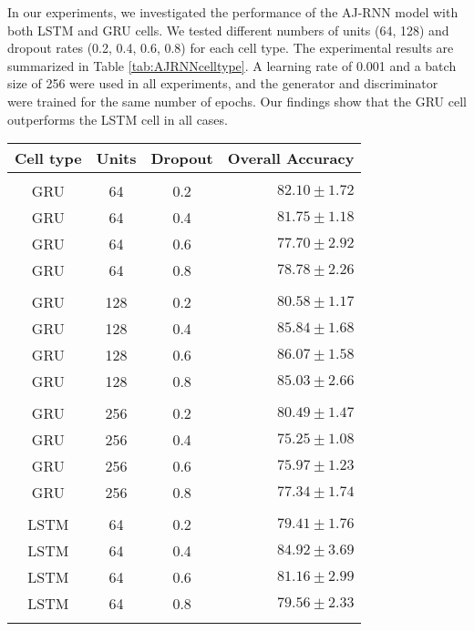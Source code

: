 In our experiments, we investigated the performance of the AJ-RNN model with both LSTM and GRU cells. 
We tested different numbers of units (64, 128) and dropout rates (0.2, 0.4, 0.6, 0.8) for each cell type. 
The experimental results are summarized in Table \ref{tab:AJRNNcelltype}. 
A learning rate of 0.001 and a batch size of 256 were used in all experiments, and the generator and discriminator were trained for the same number of epochs. 
Our findings show that the GRU cell outperforms the LSTM cell in all cases.

\begin{table}[H]
  \centering
  \begin{tabular}{cccr} 
      Cell type & Units & Dropout & Overall Accuracy\\[0.2cm] 
      \hline \\[-0.2cm] 
      GRU   &   64  & 0.2 &  $82.10 \pm 1.72$\\
      GRU   &   64  & 0.4 &  $81.75 \pm 1.18$\\
      GRU   &   64  & 0.6 &  $77.70 \pm 2.92$\\
      GRU   &   64  & 0.8 &  $78.78 \pm 2.26$\\[0.05cm] \hline \\[-0.25cm]

      GRU   &   128 & 0.2 &  $80.58 \pm 1.17$\\
      GRU   &   128 & 0.4 &  $85.84 \pm 1.68$\\
      GRU   &   128 & 0.6 &  $\mathbf{86.07 \pm 1.58}$\\
      GRU   &   128 & 0.8 &  $85.03 \pm 2.66$\\[0.05cm] \hline \\[-0.25cm]

      GRU   &   256 & 0.2 &  $80.49 \pm 1.47$\\
      GRU   &   256 & 0.4 &  $75.25 \pm 1.08$\\
      GRU   &   256 & 0.6 &  $75.97 \pm 1.23$\\
      GRU   &   256 & 0.8 &  $77.34 \pm 1.74$\\[0.05cm] \hline \\[-0.25cm]

      LSTM  &   64  & 0.2 &  $79.41 \pm 1.76$\\
      LSTM  &   64  & 0.4 &  $84.92 \pm 3.69$\\
      LSTM  &   64  & 0.6 &  $81.16 \pm 2.99$\\
      LSTM  &   64  & 0.8 &  $79.56 \pm 2.33$\\[0.05cm] \hline \\[-0.25cm]


\end{tabular}
\end{table}

